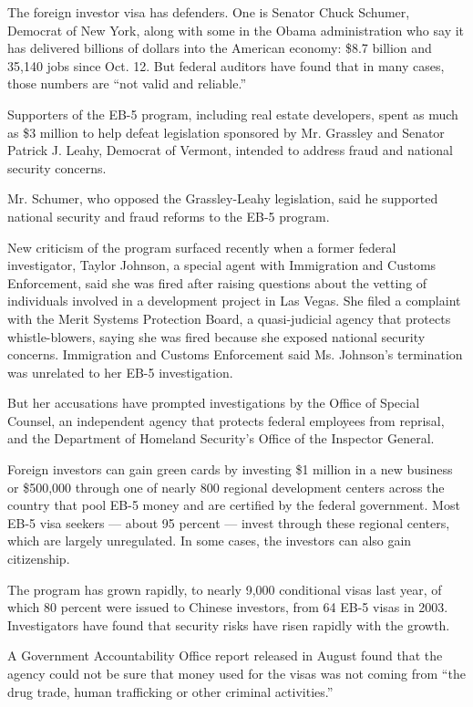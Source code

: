 The foreign investor visa has defenders. One is Senator Chuck Schumer,
Democrat of New York, along with some in the Obama administration who
say it has delivered billions of dollars into the American economy:
\$8.7 billion and 35,140 jobs since Oct. 12. But federal auditors have
found that in many cases, those numbers are ``not valid and reliable.''

Supporters of the EB-5 program, including real estate developers, spent
as much as \$3 million to help defeat legislation sponsored by Mr.
Grassley and Senator Patrick J. Leahy, Democrat of Vermont, intended to
address fraud and national security concerns.

Mr. Schumer, who opposed the Grassley-Leahy legislation, said he
supported national security and fraud reforms to the EB-5 program.

New criticism of the program surfaced recently when a former federal
investigator, Taylor Johnson, a special agent with Immigration and
Customs Enforcement, said she was fired after raising questions about
the vetting of individuals involved in a development project in Las
Vegas. She filed a complaint with the Merit Systems Protection Board, a
quasi-judicial agency that protects whistle-blowers, saying she was
fired because she exposed national security concerns. Immigration and
Customs Enforcement said Ms. Johnson's termination was unrelated to her
EB-5 investigation.

But her accusations have prompted investigations by the Office of
Special Counsel, an independent agency that protects federal employees
from reprisal, and the Department of Homeland Security's Office of the
Inspector General.

Foreign investors can gain green cards by investing \$1 million in a new
business or \$500,000 through one of nearly 800 regional development
centers across the country that pool EB-5 money and are certified by the
federal government. Most EB-5 visa seekers --- about 95 percent ---
invest through these regional centers, which are largely unregulated. In
some cases, the investors can also gain citizenship.

The program has grown rapidly, to nearly 9,000 conditional visas last
year, of which 80 percent were issued to Chinese investors, from 64 EB-5
visas in 2003. Investigators have found that security risks have risen
rapidly with the growth.

A Government Accountability Office report released in August found that
the agency could not be sure that money used for the visas was not
coming from ``the drug trade, human trafficking or other criminal
activities.''

